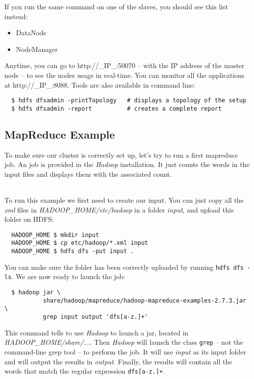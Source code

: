 \documentclass[a4paper, 12pt]{article}
\begin{document}
If you run the same command on one of the slaves, you should see this list instead:
\begin{itemize}
  \item DataNode
  \item NodeManager
\end{itemize}

Anytime, you can go to http://\_IP\_:50070 -- with the IP address of the master node -- to see the nodes usage in real-time. You can monitor all the applications at http://\_IP\_:8088. Tools are also available in command line:

\begin{verbatim}
  $ hdfs dfsadmin -printTopology   # displays a topology of the setup
  $ hdfs dfsadmin -report          # creates a complete report
\end{verbatim}

  \subsection{MapReduce Example}

To make sure our cluster is correctly set up, let's try to run a first mapreduce job. An job is provided in the \textit{Hadoop} installation. It just counts the words in the input files and displays them with the associated count. 

~\\
To run this example we first need to create our input. You can just copy all the \textit{xml} files in \textit{HADOOP\_HOME/etc/hadoop} in a folder \textit{input}, and upload this folder on HDFS:

\begin{verbatim}
  HADOOP_HOME $ mkdir input
  HADOOP_HOME $ cp etc/hadoop/*.xml input
  HADOOP_HOME $ hdfs dfs -put input .
\end{verbatim}

You can make sure the folder has been correctly uploaded by running \texttt{hdfs dfs -ls}. We are now ready to launch the job:

\begin{verbatim}
  $ hadoop jar \
           share/hadoop/mapreduce/hadoop-mapreduce-examples-2.7.3.jar \
           grep input output 'dfs[a-z.]+'
\end{verbatim}

This command tells to use \textit{Hadoop} to launch a jar, located in \textit{HADOOP\_HOME/share/...}. Then \textit{Hadoop} will launch the class \texttt{grep} -- not the command-line grep tool -- to perform the job. It will use \textit{input} as its input folder and will output the results in \textit{output}. Finally, the results will contain all the words that match the regular expression \texttt{dfs[a-z.]+}.
\end{document}
